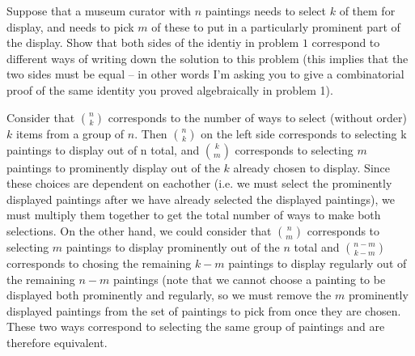 \documentclass[11pt]{amsart}
\begin{document}
\begin{problem}

Suppose that a museum curator with $n$ paintings needs to select $k$ of them for display, and needs to pick $m$ of these to put in a particularly prominent part of the display.  Show that both sides of the identiy in problem $1$ correspond to different ways of writing down the solution to this problem (this implies that the two sides must be equal -- in other words I'm asking you to give a combinatorial proof of the same identity you proved algebraically in problem 1).  
\end{problem}
\begin{solution}

Consider that $\binom{n}{k}$ corresponds to the number of ways to select (without order) $k$ items from a group of $n$.  Then $\binom{n}{k}$ on the left side corresponds to selecting k paintings to display out of n total, and $\binom{k}{m}$ corresponds  to selecting $m$ paintings to prominently display out of the $k$ already chosen to display.  Since these choices are dependent on eachother (i.e. we must select the prominently displayed paintings after we have already selected the displayed paintings), we must multiply them together to get the total number of ways to make both selections.  On the other hand, we could consider that $\binom{n}{m}$ corresponds to selecting $m$ paintings to display prominently out of the $n$ total and $\binom{n-m}{k-m}$ corresponds to chosing the remaining $k-m$ paintings to display regularly out of the remaining $n-m$ paintings (note that we cannot choose a painting to be displayed both prominently and regularly, so we must remove the $m$ prominently displayed paintings from the set of paintings to pick from once they are chosen.  These two ways correspond to selecting the same group of paintings and are therefore equivalent.
\end{solution}
\end{document}
